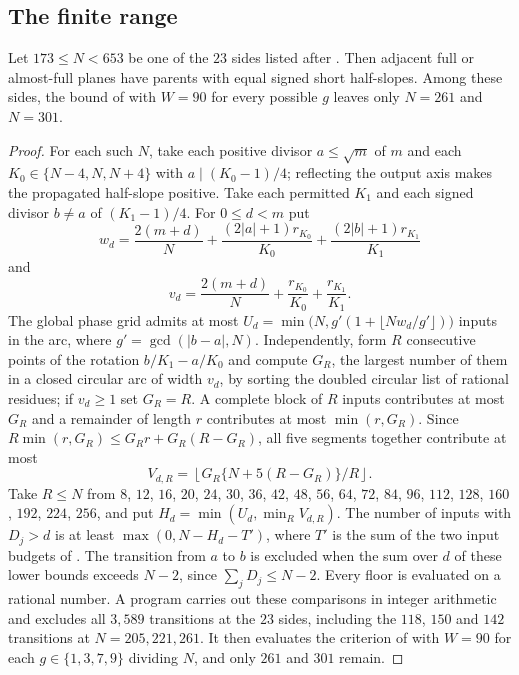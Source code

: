 \documentclass[11pt,colorlinks]{charlie}
\begin{document}
\subsection{The finite range}

\begin{proposition}\label{prop:finite-prop}
Let $173\le N<653$ be one of the $23$ sides listed after . Then adjacent full or almost-full planes have parents with equal signed short half-slopes. Among these sides, the bound of  with $W=90$ for every possible $g$ leaves only $N=261$ and $N=301$.
\end{proposition}

\begin{proof}
For each such $N$, take each positive divisor $a\le\sqrt m$ of $m$ and each $K_0\in\{N-4,N,N+4\}$ with $a\mid(K_0-1)/4$; reflecting the output axis makes the propagated half-slope positive. Take each permitted $K_1$ and each signed divisor $b\ne a$ of $(K_1-1)/4$. For $0\le d<m$ put
\[
 w_d=\frac{2(m+d)}N+\frac{(2|a|+1)r_{K_0}}{K_0}+\frac{(2|b|+1)r_{K_1}}{K_1}
\]
and
\[
 v_d=\frac{2(m+d)}N+\frac{r_{K_0}}{K_0}+\frac{r_{K_1}}{K_1}.
\]
The global phase grid admits at most $U_d=\min\bigl(N,g'(1+\lfloor Nw_d/g'\rfloor)\bigr)$ inputs in the arc, where $g'=\gcd(|b-a|,N)$. Independently, form $R$ consecutive points of the rotation $b/K_1-a/K_0$ and compute $G_R$, the largest number of them in a closed circular arc of width $v_d$, by sorting the doubled circular list of rational residues; if $v_d\ge1$ set $G_R=R$. A complete block of $R$ inputs contributes at most $G_R$ and a remainder of length $r$ contributes at most $\min(r,G_R)$. Since $R\min(r,G_R)\le G_Rr+G_R(R-G_R)$, all five segments together contribute at most
\[
 V_{d,R}=\left\lfloor G_R\{N+5(R-G_R)\}/R\right\rfloor .
\]
Take $R\le N$ from $8$, $12$, $16$, $20$, $24$, $30$, $36$, $42$, $48$, $56$, $64$, $72$, $84$, $96$, $112$, $128$, $160$, $192$, $224$, $256$, and put $H_d=\min(U_d,\min_RV_{d,R})$. The number of inputs with $D_j>d$ is at least $\max(0,N-H_d-T')$, where $T'$ is the sum of the two input budgets of . The transition from $a$ to $b$ is excluded when the sum over $d$ of these lower bounds exceeds $N-2$, since $\sum_jD_j\le N-2$. Every floor is evaluated on a rational number. A program carries out these comparisons in integer arithmetic and excludes all $3{,}589$ transitions at the $23$ sides, including the $118$, $150$ and $142$ transitions at $N=205,221,261$. It then evaluates the criterion of  with $W=90$ for each $g\in\{1,3,7,9\}$ dividing $N$, and only $261$ and $301$ remain.
\end{proof}
\end{document}
